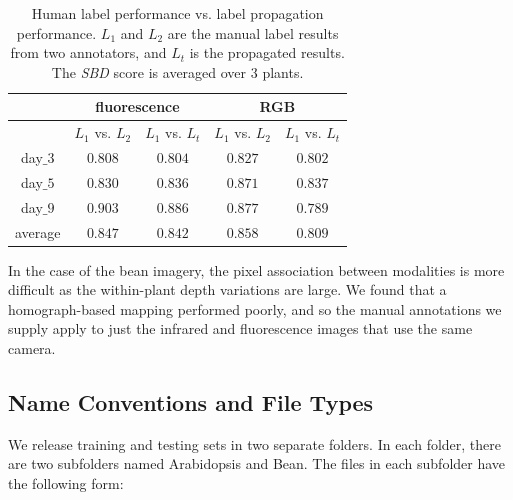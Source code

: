 \begin{table}[t!]
\centering
\caption{Human label performance vs. label propagation performance.
$L_1$ and $L_2$ are the manual label results from two annotators, and $L_t$ is the propagated results.
The {\it{SBD}} score is averaged over $3$ plants.}
\begin{tabular}{c|c|c|c|c}
\hline
    & \multicolumn{2}{c|}{fluorescence} & \multicolumn{2}{c}{RGB}\\ \hline
    & $L_1$ vs. $L_2$  & $L_1$ vs. $L_t$ & $L_1$ vs. $L_2$ & $L_1$ vs. $L_t$ \\ \hline
   day$\_3$ & $0.808$ & $0.804$ & $0.827$ & $0.802$ \\ \hline
   day$\_5$ & $0.830$ & $0.836$ & $0.871$ & $0.837$ \\ \hline
   day$\_9$ & $0.903$ & $0.886$ & $0.877$ & $0.789$ \\ \hline
    average &   $0.847$ & $0.842$ & $0.858$ & $0.809$ \\ \hline
\end{tabular}
\label{tab:labelError}
\end{table}


In the case of the bean imagery, the pixel association between modalities is more difficult as the within-plant depth variations are large.
We found that a homograph-based mapping performed poorly, and so the manual annotations we supply apply to just the infrared and fluorescence images that use the same camera.


\subsection{Name Conventions and File Types}
We release training and testing sets in two separate folders.
In each folder, there are two subfolders named Arabidopsis and Bean.
The files in each subfolder have the following form:

